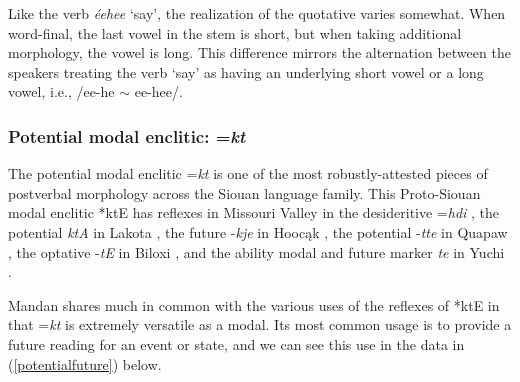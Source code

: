 Like the verb \textit{éehee} `say', the realization of the quotative varies somewhat. When word-final, the last vowel in the stem is short, but when taking additional morphology, the vowel is long. This difference mirrors the alternation between the speakers treating the verb `say' as having an underlying short vowel or  a long vowel, i.e., /ee-he $\sim$ ee-hee/.

\subsubsection{Potential modal enclitic: =\textit{kt}}

The potential modal enclitic =\textit{kt} is one of the most robustly-attested pieces of postverbal morphology across the Siouan language family. This Proto-Siouan modal enclitic *ktE has reflexes in Missouri Valley in the desideritive =\textit{hdi} \citep[194]{park2012}, the potential \textit{ktA} in Lakota \citep[821]{ullrich2011}, the future -\textit{kje} in Hoocąk \citep[54]{helmbrechtlehmann2006}, the potential -\textit{tte} in Quapaw \citep[484]{rankin2005}, the optative -\textit{tE} in Biloxi \citep[31]{einaudi1976}, and the ability modal and future marker \textit{te} in Yuchi \citep[291]{linn2000}.

Mandan shares much in common with the various uses of the reflexes of *ktE in that =\textit{kt} is extremely versatile as a modal. Its most common usage is to provide a future reading for an event or state, and we can see this use in the data in (\ref{potentialfuture}) below.

